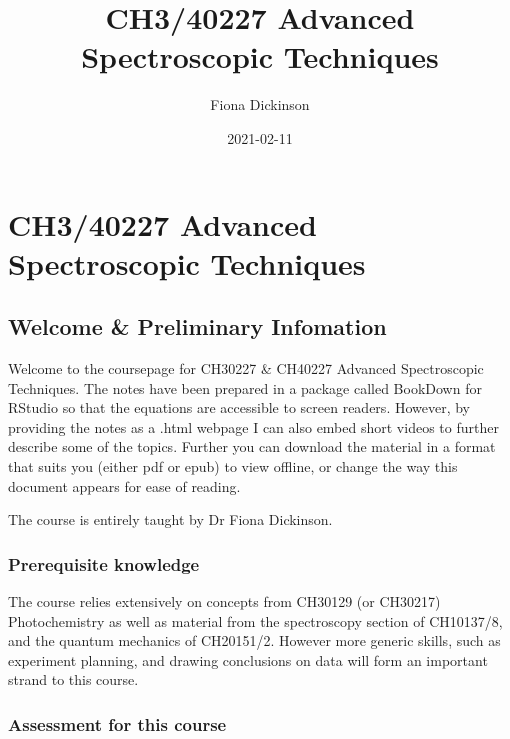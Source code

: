 \documentclass[
]{book}
\title{CH3/40227 Advanced Spectroscopic Techniques}
\author{Fiona Dickinson}
\date{2021-02-11}
\begin{document}
\maketitle

{
\setcounter{tocdepth}{1}
\tableofcontents
}
\hypertarget{ch340227-advanced-spectroscopic-techniques}{%
\chapter*{CH3/40227 Advanced Spectroscopic Techniques}\label{ch340227-advanced-spectroscopic-techniques}}

\hypertarget{welcome-preliminary-infomation}{%
\section*{Welcome \& Preliminary Infomation}\label{welcome-preliminary-infomation}}

Welcome to the coursepage for CH30227 \& CH40227 Advanced Spectroscopic Techniques. The notes have been prepared in a package called BookDown for RStudio so that the equations are accessible to screen readers. However, by providing the notes as a .html webpage I can also embed short videos to further describe some of the topics. Further you can download the material in a format that suits you (either pdf or epub) to view offline, or change the way this document appears for ease of reading.

The course is entirely taught by Dr Fiona Dickinson.

\hypertarget{prerequisite-knowledge}{%
\subsection*{Prerequisite knowledge}\label{prerequisite-knowledge}}

The course relies extensively on concepts from CH30129 (or CH30217) Photochemistry as well as material from the spectroscopy section of CH10137/8, and the quantum mechanics of CH20151/2. However more generic skills, such as experiment planning, and drawing conclusions on data will form an important strand to this course.

\hypertarget{assessment-for-this-course}{%
\subsection*{Assessment for this course}\label{assessment-for-this-course}}
\end{document}

